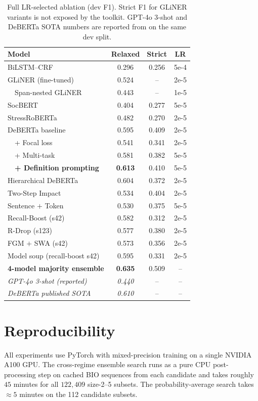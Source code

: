 \documentclass[11pt]{article}
\begin{document}
\begin{table}[t]
\centering\small
\setlength{\tabcolsep}{5pt}
\begin{tabular}{lccc}
\toprule
Model & Relaxed & Strict & LR \\
\midrule
BiLSTM--CRF                               & 0.296 & 0.256 & 5e-4 \\
GLiNER (fine-tuned)                       & 0.524 & -- & 2e-5 \\
\ \ Span-nested GLiNER                    & 0.443 & -- & 1e-5 \\
SocBERT                                   & 0.404 & 0.277 & 5e-5 \\
StressRoBERTa                             & 0.482 & 0.270 & 2e-5 \\
DeBERTa baseline                          & 0.595 & 0.409 & 2e-5 \\
\ \ + Focal loss                          & 0.541 & 0.341 & 2e-5 \\
\ \ + Multi-task                          & 0.581 & 0.382 & 5e-5 \\
\ \ \textbf{+ Definition prompting}       & \textbf{0.613} & 0.410 & 5e-5 \\
Hierarchical DeBERTa                      & 0.604 & 0.372 & 2e-5 \\
Two-Step Impact                           & 0.534 & 0.404 & 2e-5 \\
Sentence $+$ Token                        & 0.530 & 0.375 & 5e-5 \\
Recall-Boost (s42)                        & 0.582 & 0.312 & 2e-5 \\
R-Drop (s123)                             & 0.577 & 0.380 & 2e-5 \\
FGM $+$ SWA (s42)                         & 0.573 & 0.356 & 2e-5 \\
Model soup (recall-boost s42)             & 0.595 & 0.331 & 2e-5 \\
\textbf{4-model majority ensemble}        & \textbf{0.635} & 0.509 & -- \\
\midrule
\textit{GPT-4o 3-shot (reported)}         & \textit{0.440} & -- & -- \\
\textit{DeBERTa published SOTA}           & \textit{0.610} & -- & -- \\
\bottomrule
\end{tabular}
\caption{Full LR-selected ablation (dev F1). Strict F1 for GLiNER
variants is not exposed by the toolkit. GPT-4o 3-shot and DeBERTa SOTA
numbers are reported from \citet{dey2025reddit} on the same dev split.}
\label{tab:full}
\end{table}

\section{Reproducibility}
\label{sec:repro}

All experiments use PyTorch with mixed-precision training on a single
NVIDIA A100 GPU. The cross-regime ensemble search runs as a pure CPU
post-processing step on cached BIO sequences from each candidate and
takes roughly $45$ minutes for all $122{,}409$ size-2--5 subsets. The
probability-average search takes $\approx 5$ minutes on the 112
candidate subsets.
\end{document}
